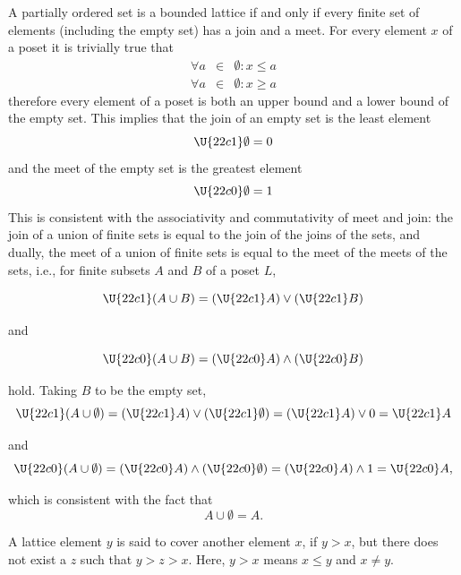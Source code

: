 \documentclass{conm-p-l}
\theoremstyle{definition}
\theoremstyle{remark}
\numberwithin{equation}{section}
\theoremstyle{plain}
\begin{document}
A partially ordered set is a bounded lattice if and only if every finite set
of elements (including the empty set) has a join and a meet. For every
element $x$ of a poset it is trivially true that%
\begin{eqnarray}
\forall a &\in &\emptyset :x\leq a \\
\forall a &\in &\emptyset :x\geq a
\end{eqnarray}
therefore every element of a poset is both an upper bound and a lower bound
of the empty set. This implies that the join of an empty set is the least
element 
\begin{equation}
\U{22c1} \emptyset =0
\end{equation}
and the meet of the empty set is the greatest element 
\begin{equation}
\U{22c0} \emptyset =1
\end{equation}%
This is consistent with the associativity and commutativity of meet and
join: the join of a union of finite sets is equal to the join of the joins
of the sets, and dually, the meet of a union of finite sets is equal to the
meet of the meets of the sets, i.e., for finite subsets $A$ and $B$ of a
poset $L$,

\begin{equation}
\U{22c1} (A\cup B)=(\U{22c1} A)\vee (\U{22c1} B)
\end{equation}

and

\begin{equation}
\U{22c0} (A\cup B)=(\U{22c0} A)\wedge (\U{22c0} B)
\end{equation}

hold. Taking $B$ to be the empty set,%
\begin{equation}
\U{22c1} (A\cup \emptyset )=(\U{22c1} A)\vee (\U{22c1} \emptyset )=(\U{22c1}
A)\vee 0=\U{22c1} A
\end{equation}

and%
\begin{equation}
\U{22c0} (A\cup \emptyset )=(\U{22c0} A)\wedge (\U{22c0} \emptyset )=(%
\U{22c0} A)\wedge 1=\U{22c0} A,
\end{equation}

which is consistent with the fact that 
\begin{equation}
A\cup \emptyset =A.
\end{equation}

A lattice element $y$ is said to cover another element $x$, if $y>x$, but
there does not exist a $z$ such that $y>z>x$. Here, $y>x$ means $x\leq y$
and $x\neq y.$
\end{document}

